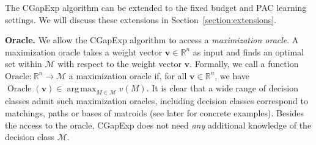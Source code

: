 \documentclass{article}
\newcommand{\Algorithm}{{\small \textsf{CGapExp}}\xspace}
\newcommand{\M}{\mathcal M}
\newcommand{\RR}{\mathbb R}
\DeclareMathOperator*{\argmax}{arg\,max}
\DeclareMathOperator{\Oracle}{Oracle}
\renewcommand{\vec}[1]{\boldsymbol{#1}}
\begin{document}
The \Algorithm algorithm can be extended to the fixed budget and PAC learning settings. 
We will discuss these extensions in Section~\ref{section:extensions}.



\textbf{Oracle.}
We allow the \Algorithm algorithm to access a \emph{maximization oracle}. 
A maximization oracle takes a weight vector $\vec v \in \RR^{n}$ as input and finds an optimal set within $\M$ with respect to the weight vector $\vec v$.
Formally, we call a function $\text{Oracle:}~\RR^{n} \rightarrow \M$ a maximization oracle if, for all $\vec v\in \RR^{n}$, we have $\Oracle(\vec v) \in \argmax_{M\in \M} v(M)$.
It is clear that a wide range of decision classes admit such maximization oracles, including decision classes correspond to matchings, paths or bases of matroids (see later for concrete examples).
Besides the access to the oracle, \Algorithm does not need \emph{any} additional knowledge of the decision class $\M$.

\end{document}
